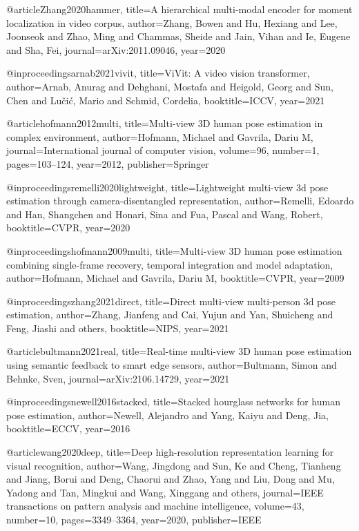 @article{Zhang2020hammer,
  title={A hierarchical multi-modal encoder for moment localization in video corpus},
  author={Zhang, Bowen and Hu, Hexiang and Lee, Joonseok and Zhao, Ming and Chammas, Sheide and Jain, Vihan and Ie, Eugene and Sha, Fei},
  journal={arXiv:2011.09046},
  year={2020}
}

@inproceedings{arnab2021vivit,
  title={Vi{V}it: A video vision transformer},
  author={Arnab, Anurag and Dehghani, Mostafa and Heigold, Georg and Sun, Chen and Lu{\v{c}}i{\'c}, Mario and Schmid, Cordelia},
  booktitle=ICCV,
  year={2021}
}

@article{hofmann2012multi,
  title={Multi-view {3D} human pose estimation in complex environment},
  author={Hofmann, Michael and Gavrila, Dariu M},
  journal={International journal of computer vision},
  volume={96},
  number={1},
  pages={103--124},
  year={2012},
  publisher={Springer}
}

@inproceedings{remelli2020lightweight,
  title={Lightweight multi-view 3d pose estimation through camera-disentangled representation},
  author={Remelli, Edoardo and Han, Shangchen and Honari, Sina and Fua, Pascal and Wang, Robert},
  booktitle=CVPR,
  year={2020}
}

@inproceedings{hofmann2009multi,
  title={Multi-view {3D} human pose estimation combining single-frame recovery, temporal integration and model adaptation},
  author={Hofmann, Michael and Gavrila, Dariu M},
  booktitle=CVPR,
  year={2009}
}

@inproceedings{zhang2021direct,
  title={Direct multi-view multi-person 3d pose estimation},
  author={Zhang, Jianfeng and Cai, Yujun and Yan, Shuicheng and Feng, Jiashi and others},
  booktitle=NIPS,
  year={2021}
}

@article{bultmann2021real,
  title={Real-time multi-view {3D} human pose estimation using semantic feedback to smart edge sensors},
  author={Bultmann, Simon and Behnke, Sven},
  journal={arXiv:2106.14729},
  year={2021}
}

@inproceedings{newell2016stacked,
  title={Stacked hourglass networks for human pose estimation},
  author={Newell, Alejandro and Yang, Kaiyu and Deng, Jia},
  booktitle=ECCV,
  year={2016}
}

@article{wang2020deep,
  title={Deep high-resolution representation learning for visual recognition},
  author={Wang, Jingdong and Sun, Ke and Cheng, Tianheng and Jiang, Borui and Deng, Chaorui and Zhao, Yang and Liu, Dong and Mu, Yadong and Tan, Mingkui and Wang, Xinggang and others},
  journal={IEEE transactions on pattern analysis and machine intelligence},
  volume={43},
  number={10},
  pages={3349--3364},
  year={2020},
  publisher={IEEE}
}

